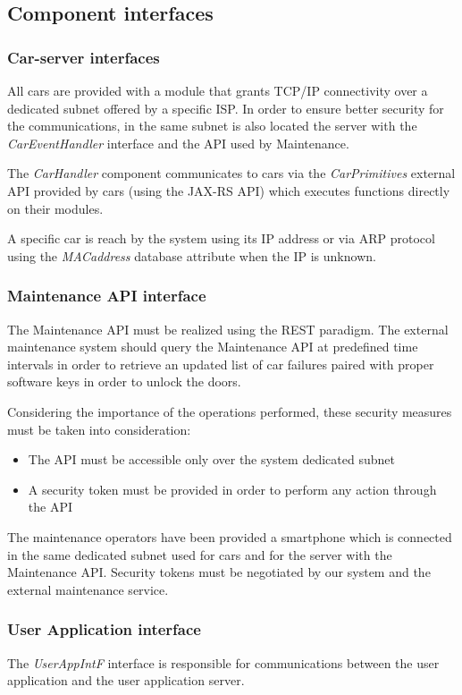 \subsection{Component interfaces}

\subsubsection{Car-server interfaces}
\label{sec:carServerInt}
All cars are provided with a module that grants TCP/IP connectivity over a dedicated subnet offered by a specific ISP. In order to ensure better security for the communications, in the same subnet is also located the server with the \mbox{\emph{CarEventHandler}} interface and the API used by Maintenance.

The \emph{CarHandler} component communicates to cars via the \mbox{\emph{CarPrimitives}} external API provided by cars (using the JAX-RS API) which executes functions directly on their modules.

A specific car is reach by the system using its IP address or via ARP protocol using the \emph{MACaddress} database attribute when the IP is unknown.

\subsubsection{Maintenance API interface}
The Maintenance API must be realized using the REST paradigm. The external maintenance system should query the Maintenance API at predefined time intervals in order to retrieve an updated list of car failures paired with proper software keys in order to unlock the doors.

Considering the importance of the operations performed, these security measures must be taken into consideration:
\begin{itemize}
	\item The API must be accessible only over the system dedicated subnet
	\item A security token must be provided in order to perform any action through the API
\end{itemize}
The maintenance operators have been provided a smartphone which is connected in the same dedicated subnet used for cars and for the server with the Maintenance API.
Security tokens must be negotiated by our system and the external maintenance service.

\subsubsection{User Application interface}
The \emph{UserAppIntF} interface is responsible for communications between the user application and the user application server.

